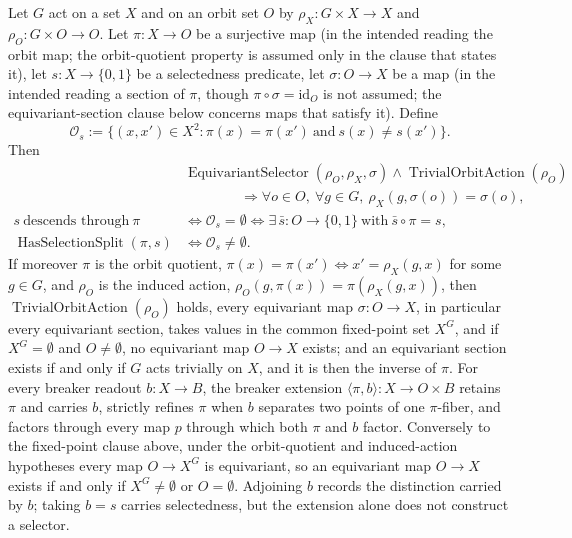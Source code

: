 \begin{theorem}\label{thm:F15a}
Let \(G\) act on a set \(X\) and on an orbit set \(O\) by
\(\rho_X:G\times X\to X\) and \(\rho_O:G\times O\to O\).  Let
\(\pi:X\to O\) be a surjective map (in the intended reading the orbit map; the
orbit-quotient property is assumed only in the clause that states it), let
\(s:X\to\{0,1\}\) be a selectedness predicate, let
\(\sigma:O\to X\) be a map (in the intended reading a section of \(\pi\), though \(\pi\circ\sigma=\mathrm{id}_O\) is not assumed; the equivariant-section clause below concerns maps that satisfy it).  Define
\[
  \mathcal O_s
  :=
  \{(x,x')\in X^2:\pi(x)=\pi(x')\ \text{and}\ s(x)\ne s(x')\}.
\]
Then
\begin{align*}
  &\operatorname{EquivariantSelector}(\rho_O,\rho_X,\sigma)
    \wedge \operatorname{TrivialOrbitAction}(\rho_O)\\
  &\hspace{4em}\Longrightarrow
    \forall o\in O,\ \forall g\in G,\
      \rho_X(g,\sigma(o))=\sigma(o),\\
  s\ \text{descends through}\ \pi
  &\iff
  \mathcal O_s=\emptyset
  \iff
  \exists\,\bar s:O\to\{0,1\}\ \text{with}\ \bar s\circ\pi=s,\\
  \operatorname{HasSelectionSplit}(\pi,s)
  &\iff
  \mathcal O_s\ne\emptyset.
\end{align*}
If moreover \(\pi\) is the orbit quotient,
\(\pi(x)=\pi(x')\iff x'=\rho_X(g,x)\) for some \(g\in G\), and \(\rho_O\) is
the induced action, \(\rho_O(g,\pi(x))=\pi(\rho_X(g,x))\), then
\(\operatorname{TrivialOrbitAction}(\rho_O)\) holds, every equivariant map
\(\sigma:O\to X\), in particular every equivariant section, takes values in the
common fixed-point set \(X^G\), and if \(X^G=\emptyset\) and
\(O\ne\emptyset\), no equivariant map \(O\to X\) exists; and an equivariant section exists if and only if \(G\) acts trivially on \(X\), and it is then the inverse of \(\pi\).
For every breaker readout \(b:X\to B\), the breaker extension
\(\langle\pi,b\rangle:X\to O\times B\) retains \(\pi\) and carries \(b\), strictly
refines \(\pi\) when \(b\) separates two points of one \(\pi\)-fiber, and factors
through every map \(p\) through which both \(\pi\) and \(b\) factor. Conversely to the fixed-point clause above, under the orbit-quotient and induced-action hypotheses every map \(O\to X^G\) is equivariant, so an equivariant map \(O\to X\) exists if and only if \(X^G\ne\emptyset\) or \(O=\emptyset\). Adjoining \(b\) records the
distinction carried by \(b\); taking \(b=s\) carries selectedness, but the
extension alone does not construct a selector.
\end{theorem}
